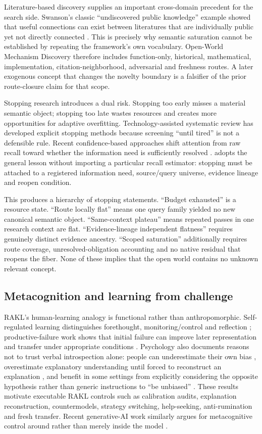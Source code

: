 Literature-based discovery supplies an important cross-domain precedent for the search side. Swanson's classic ``undiscovered public knowledge'' example showed that useful connections can exist between literatures that are individually public yet not directly connected \cite{swanson1986}. This is precisely why semantic saturation cannot be established by repeating the framework's own vocabulary. Open-World Mechanism Discovery therefore includes function-only, historical, mathematical, implementation, citation-neighborhood, adversarial and freshness routes. A later exogenous concept that changes the novelty boundary is a falsifier of the prior route-closure claim for that scope.

Stopping research introduces a dual risk. Stopping too early misses a material semantic object; stopping too late wastes resources and creates more opportunities for adaptive overfitting. Technology-assisted systematic review has developed explicit stopping methods because screening ``until tired'' is not a defensible rule. Recent confidence-based approaches shift attention from raw recall toward whether the information need is sufficiently resolved \cite{fletcher2026stopping}. \RAKL{} adopts the general lesson without importing a particular recall estimator: stopping must be attached to a registered information need, source/query universe, evidence lineage and reopen condition.

This produces a hierarchy of stopping statements. ``Budget exhausted'' is a resource state. ``Route locally flat'' means one query family yielded no new canonical semantic object. ``Same-context plateau'' means repeated passes in one research context are flat. ``Evidence-lineage independent flatness'' requires genuinely distinct evidence ancestry. ``Scoped saturation'' additionally requires route coverage, unresolved-obligation accounting and no native residual that reopens the fiber. None of these implies that the open world contains no unknown relevant concept.

\subsection{Metacognition and learning from challenge}
RAKL's human-learning analogy is functional rather than anthropomorphic. Self-regulated learning distinguishes forethought, monitoring/control and reflection \cite{zimmerman2002}; productive-failure work shows that initial failure can improve later representation and transfer under appropriate conditions \cite{kapur2008}. Psychology also documents reasons not to trust verbal introspection alone: people can underestimate their own bias \cite{pronin2002}, overestimate explanatory understanding until forced to reconstruct an explanation \cite{rozenblit2002}, and benefit in some settings from explicitly considering the opposite hypothesis rather than generic instructions to ``be unbiased'' \cite{lord1984}. These results motivate executable RAKL controls such as calibration audits, explanation reconstruction, countermodels, strategy switching, help-seeking, anti-rumination and fresh transfer. Recent generative-AI work similarly argues for metacognitive control around rather than merely inside the model \cite{ji2026}.


